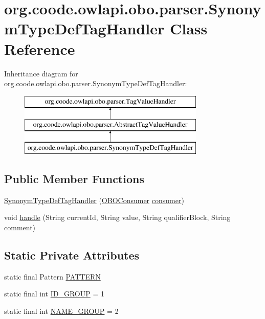 \hypertarget{classorg_1_1coode_1_1owlapi_1_1obo_1_1parser_1_1_synonym_type_def_tag_handler}{\section{org.\-coode.\-owlapi.\-obo.\-parser.\-Synonym\-Type\-Def\-Tag\-Handler Class Reference}
\label{classorg_1_1coode_1_1owlapi_1_1obo_1_1parser_1_1_synonym_type_def_tag_handler}
}
Inheritance diagram for org.\-coode.\-owlapi.\-obo.\-parser.\-Synonym\-Type\-Def\-Tag\-Handler\-:\begin{figure}[H]
\begin{center}
\leavevmode
\includegraphics[height=3.000000cm]{classorg_1_1coode_1_1owlapi_1_1obo_1_1parser_1_1_synonym_type_def_tag_handler}
\end{center}
\end{figure}
\subsection*{Public Member Functions}
\begin{DoxyCompactItemize}
\item 
\hyperlink{classorg_1_1coode_1_1owlapi_1_1obo_1_1parser_1_1_synonym_type_def_tag_handler_af24131e7a06d691b2fa1409328fc86a1}{Synonym\-Type\-Def\-Tag\-Handler} (\hyperlink{classorg_1_1coode_1_1owlapi_1_1obo_1_1parser_1_1_o_b_o_consumer}{O\-B\-O\-Consumer} \hyperlink{classorg_1_1coode_1_1owlapi_1_1obo_1_1parser_1_1_abstract_tag_value_handler_ab27f1ff22d15640c5f81585f18265137}{consumer})
\item 
void \hyperlink{classorg_1_1coode_1_1owlapi_1_1obo_1_1parser_1_1_synonym_type_def_tag_handler_a4b90032bcc19a3eca4d4576be1b30501}{handle} (String current\-Id, String value, String qualifier\-Block, String comment)
\end{DoxyCompactItemize}
\subsection*{Static Private Attributes}
\begin{DoxyCompactItemize}
\item 
static final Pattern \hyperlink{classorg_1_1coode_1_1owlapi_1_1obo_1_1parser_1_1_synonym_type_def_tag_handler_abd31ce993c9159269f61307e05ecf765}{P\-A\-T\-T\-E\-R\-N}
\item 
static final int \hyperlink{classorg_1_1coode_1_1owlapi_1_1obo_1_1parser_1_1_synonym_type_def_tag_handler_ae12ad28d9f2af58974f6871db452a6c0}{I\-D\-\_\-\-G\-R\-O\-U\-P} = 1
\item 
static final int \hyperlink{classorg_1_1coode_1_1owlapi_1_1obo_1_1parser_1_1_synonym_type_def_tag_handler_a23a683926f29340c2f60744038040b52}{N\-A\-M\-E\-\_\-\-G\-R\-O\-U\-P} = 2
\end{DoxyCompactItemize}

